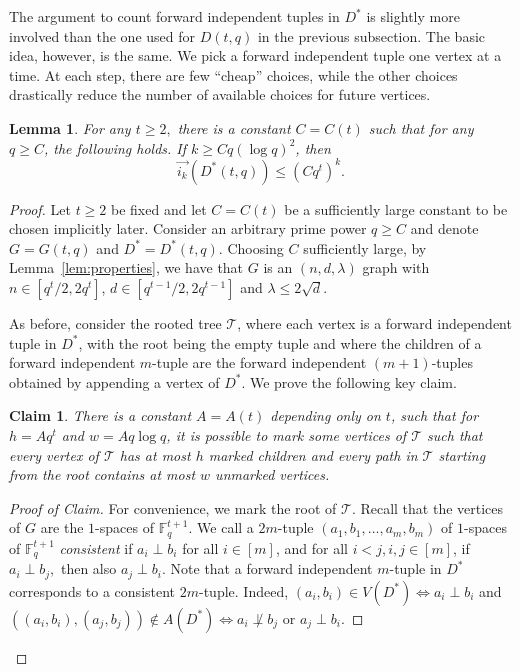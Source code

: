 \documentclass{article}
\theoremstyle{plain}
\newtheorem{claim}[theorem]{Claim}
\newtheorem{lemma}[theorem]{Lemma}
\theoremstyle{definition}
\newcommand{\cT}{\mathcal{T}}
\newcommand{\bF}{\mathbb{F}}
\newcommand{\fwi}[1]{\overrightarrow{i_{#1}}}
\begin{document}
The argument to count forward independent tuples in $D^*$ is slightly more involved than the one used for $D(t, q)$ in the previous subsection. The basic idea, however, is the same. We pick a forward independent tuple one vertex at a time. At each step, there are few ``cheap'' choices, while the other choices drastically reduce the number of available choices for future vertices.

\begin{lemma} \label{lem:fw-ind-sets-s1}
    For any $t \ge 2,$ there is a constant $C = C(t)$ such that for any $q \ge C$, the following holds. If $k \ge C q (\log q)^2$, then
    \[ \fwi{k}(D^*(t, q)) \le (C q^t)^k. \]
\end{lemma}
\begin{proof}
    Let $t \ge 2$ be fixed and let $C = C(t)$ be a sufficiently large constant to be chosen implicitly later. Consider an arbitrary prime power $q \ge C$ and denote $G = G(t, q)$ and $D^* = D^*(t, q)$. Choosing $C$ sufficiently large, by Lemma~\ref{lem:properties}, we have that $G$ is an $(n, d, \lambda)$ graph with $n \in [q^t/2, 2q^t]$, $d \in [q^{t-1}/2, 2q^{t-1}]$ and $\lambda \le 2 \sqrt{d}$.
    
    As before, consider the rooted tree $\cT$, where each vertex is a forward independent tuple in $D^*$, with the root being the empty tuple and where the children of a forward independent $m$-tuple are the forward independent $(m+1)$-tuples obtained by appending a vertex of $D^*$. We prove the following key claim.
    
    \begin{claim}
        There is a constant $A = A(t)$ depending only on $t$, such that for $h = A q^t$ and $w = A q \log q$, it is possible to mark some vertices of $\cT$ such that every vertex of $\cT$ has at most $h$ marked children and every path in $\cT$ starting from the root contains at most $w$ unmarked vertices.
    \end{claim}
    \begin{proof}[Proof of Claim]   
        For convenience, we mark the root of $\cT$. Recall that the vertices of $G$ are the $1$-spaces of $\bF_q^{t+1}$. We call a $2m$-tuple $(a_1, b_1, \dots, a_m, b_m)$ of $1$-spaces of $\bF_q^{t+1}$ \emph{consistent} if $a_i \perp b_i$ for all $i \in [m]$, and for all $i < j, i, j \in [m]$, if $a_i \perp b_j,$ then also $a_j \perp b_i$. Note that a forward independent $m$-tuple in $D^*$ corresponds to a consistent $2m$-tuple. Indeed, $(a_i, b_i) \in V(D^*) \iff a_i \perp b_i$ and $((a_i, b_i), (a_j, b_j)) \not\in A(D^*) \iff a_i \not\perp b_j \text{ or } a_j \perp b_i.$
        

\end{proof}
\end{proof}
\end{document}
